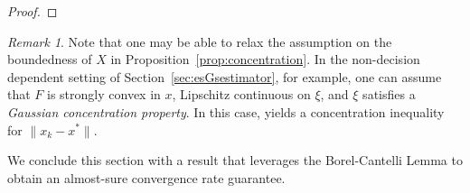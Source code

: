\documentclass[11pt,reqno]{amsart}
\newcommand{\1}{{\bf 1}}
\newcommand{\2}{{\bf 2}}
\newcommand{\al}{\alpha}
\numberwithin{equation}{section}
\theoremstyle{remark}
\newtheorem{remark}{Remark}[section]
\begin{document}
{\begin{proof}
	\end{proof}
	\begin{remark}
		Note that one may be able to relax the assumption on the boundedness of $X$ in Proposition~\ref{prop:concentration}. In the non-decision dependent setting of Section~\ref{sec:esGsestimator}, for example, one can assume that $F$ is strongly convex in $x$, Lipschitz continuous on $\xi$, and $\xi$ satisfies a \emph{Gaussian concentration property}. In this case, \cite[Thm 2.2]{frikha2012concentration} yields a concentration inequality for {$\|x_k-x^*\|$}. 
	\end{remark}
	
	{We conclude this section with a result that leverages the Borel-Cantelli Lemma to obtain an almost-sure convergence rate guarantee.}
	
}
\end{document}
